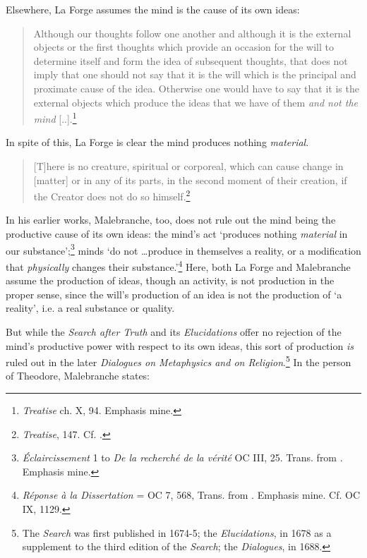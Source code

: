 \documentclass[]{article}
\begin{document}
Elsewhere, La Forge assumes the mind is the cause of its own ideas:

\begin{quote}
	Although our thoughts follow one another and although it is the external objects or the first thoughts which provide an occasion for the will to determine itself and form the idea of subsequent thoughts, that does not imply that one should not say that it is the will which is the principal and proximate cause of the idea. Otherwise one would have to say that it is the external objects which produce the ideas that we have of them \emph{and not the mind} {[}..{]}.\footnote{\emph{Treatise} ch. X, 94. Emphasis mine.}
\end{quote}

In spite of this, La Forge is clear the mind produces nothing \emph{material}.

\begin{quote}
	{[}T{]}here is no creature, spiritual or corporeal, which can cause change in {[}matter{]} or in any of its parts, in the second moment of their creation, if the Creator does not do so himself.\footnote{\emph{Treatise}, 147. Cf. \autocite{Klima1993}.}
\end{quote}

In his earlier works, Malebranche, too, does not rule out the mind being the productive cause of its own ideas: the mind's act `produces nothing \emph{material} in our substance';\footnote{\emph{Éclaircissement} 1 to \emph{De la recherché de la vérité} OC III, 25. Trans. from \autocite[52]{Nadler2005}. Emphasis mine.} minds `do not \ldots produce in themselves a reality, or a modification that \emph{physically} changes their substance.'\footnote{\emph{Réponse à la Dissertation} = OC 7, 568, Trans. from \autocite[52]{Nadler2005}. Emphasis mine. Cf. OC IX, 1129.} Here, both La Forge and Malebranche assume the production of ideas, though an activity, is not production in the proper sense, since the will's production of an idea is not the production of `a reality', i.e. a real substance or quality.

But while the \emph{Search after Truth} and its \emph{Elucidations} offer no rejection of the mind's productive power with respect to its own ideas, this sort of production \emph{is} ruled out in the later \emph{Dialogues on Metaphysics and on Religion}.\footnote{The \emph{Search} was first published in 1674-5; the \emph{Elucidations}, in 1678 as a supplement to the third edition of the \emph{Search}; the \emph{Dialogues}, in 1688.} In the person of Theodore, Malebranche states:
\end{document}
